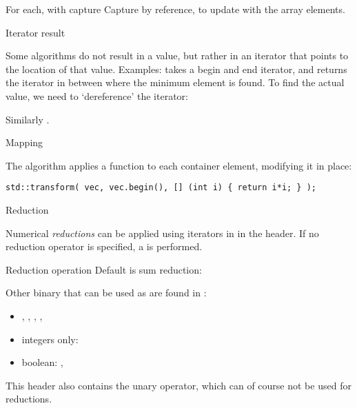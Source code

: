 \begin{block}{For each, with capture}
  \label{sl:alg-summing}
  Capture by reference, to update with the array elements.
\end{block}

 {Iterator result}

Some algorithms do not result in a value, but rather
in an iterator that points to the location of that value.
Examples:  takes a begin and end iterator,
and returns the iterator in between where the minimum element
is found.
To find the actual value, we need to `dereference'
the iterator:
%

Similarly .

 {Mapping}

The  algorithm applies a function to each
container element, modifying it in place:
\begin{lstlisting}
std::transform( vec, vec.begin(), [] (int i) { return i*i; } );
\end{lstlisting}

 {Reduction}

Numerical \emph{reductions} can be applied using iterators
in  in the  header.
If no reduction operator is specified, a
is performed.

\begin{block}{Reduction operation}
  \label{sl:vec-accumulate}
  Default is sum reduction:
\end{block}

Other binary 
that can be used as 
are found in :
\begin{itemize}
\item
  ,
  ,
  ,
  ,
\item integers only:
\item boolean:
  ,   
\end{itemize}

This header also contains the unary
 operator, which 
can of course not be used for reductions.

